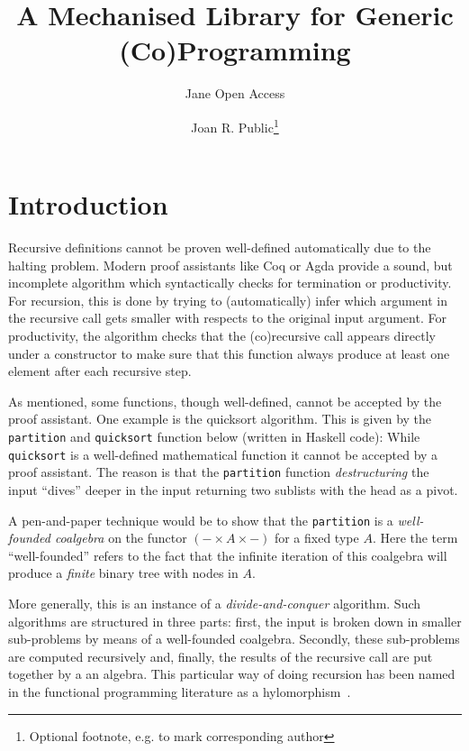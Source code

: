 \documentclass[a4paper, UKenglish, cleveref, autoref, thm-restate]{lipics-v2021}
\title{A Mechanised Library for Generic (Co)Programming}
\author{Jane {Open Access}}{Dummy University Computing Laboratory, [optional: Address], Country \and My second affiliation, Country \and \url{http://www.myhomepage.edu} }{johnqpublic@dummyuni.org}{https://orcid.org/0000-0002-1825-0097}{(Optional) author-specific funding acknowledgements}%
\author{Joan R. Public\footnote{Optional footnote, e.g. to mark corresponding author}}{Department of Informatics, Dummy College, [optional: Address], Country}{joanrpublic@dummycollege.org}{[orcid]}{[funding]}
\newcommand{\haskell}[1]{\texttt{#1}}
\begin{document}
\maketitle

\begin{abstract}

\end{abstract}

\section{Introduction}
Recursive definitions cannot be proven well-defined automatically due to the
halting problem. Modern proof assistants like Coq or Agda provide a sound, but
incomplete algorithm which syntactically checks for termination or productivity.
For recursion, this is done by trying to (automatically) infer which argument in
the recursive call gets smaller with respects to the original input argument.
For productivity, the algorithm checks that the (co)recursive call appears
directly under a constructor to make sure that this function always produce at
least one element after each recursive step.

As mentioned, some functions, though well-defined, cannot be accepted by the
proof assistant. One example is the quicksort algorithm. This is given by the
\haskell{partition} and \haskell{quicksort} function below (written in Haskell
code):
While \haskell{quicksort} is a well-defined mathematical function it cannot be
accepted by a proof assistant.  The reason is that the \haskell{partition}
function \emph{destructuring} the input ``dives'' deeper in the input returning
two sublists with the head as a pivot.

A pen-and-paper technique would be to show that the \haskell{partition} is a
\emph{well-founded coalgebra} on the functor $(- \times A \times -)$ for a fixed
type $A$. Here the term ``well-founded'' refers to the fact that the infinite
iteration of this coalgebra will produce a \emph{finite} binary tree with nodes
in $A$.

More generally, this is an instance of a \emph{divide-and-conquer} algorithm.
Such algorithms are structured in three parts: first, the input is broken down
in smaller sub-problems by means of a well-founded coalgebra. Secondly, these
sub-problems are computed recursively and, finally, the results of the recursive
call are put together by a an algebra. This particular way of doing recursion
has been named in the functional programming literature as a
hylomorphism~\cite{MeijerFP91, HuIT96}.
\end{document}
